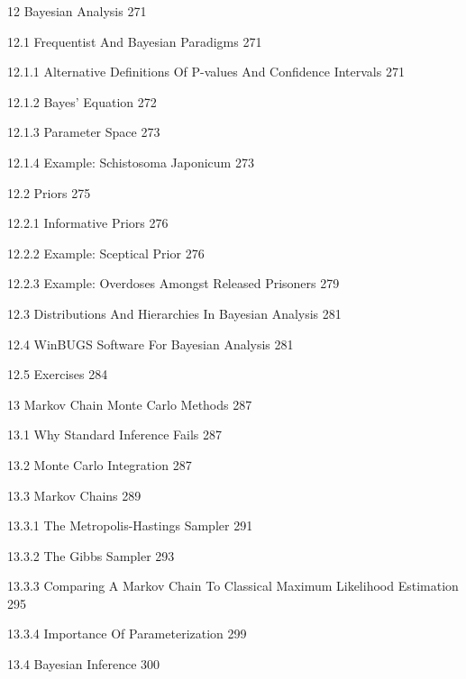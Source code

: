 12 Bayesian Analysis 271



12.1 Frequentist And Bayesian Paradigms 271



12.1.1 Alternative Definitions Of P-values And Confidence Intervals 271



12.1.2 Bayes' Equation 272



12.1.3 Parameter Space 273



12.1.4 Example: Schistosoma Japonicum 273



12.2 Priors 275



12.2.1 Informative Priors 276



12.2.2 Example: Sceptical Prior 276



12.2.3 Example: Overdoses Amongst Released Prisoners 279



12.3 Distributions And Hierarchies In Bayesian Analysis 281



12.4 WinBUGS Software For Bayesian Analysis 281



12.5 Exercises 284



13 Markov Chain Monte Carlo Methods 287



13.1 Why Standard Inference Fails 287



13.2 Monte Carlo Integration 287



13.3 Markov Chains 289



13.3.1 The Metropolis-Hastings Sampler 291



13.3.2 The Gibbs Sampler 293



13.3.3 Comparing A Markov Chain To Classical Maximum Likelihood Estimation 295



13.3.4 Importance Of Parameterization 299



13.4 Bayesian Inference 300



